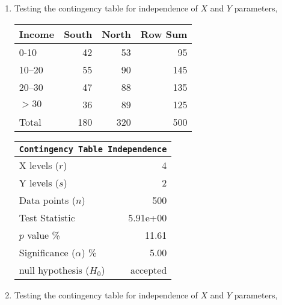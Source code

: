 \begin{enumerate}
\begin{table}[H]
\begin{minipage}{0.4\textwidth}
		\end{minipage}
	\end{table}
	\bigskip
	
	\item Testing the contingency table for independence of $ X $ and $ Y $ parameters,
	
	\begin{table}[H]
		\centering
		\begin{minipage}{0.49\textwidth}
			\centering
			\begin{tabular}{lrrr}
				\toprule
				Income &  South &  North &  Row Sum \\
				\midrule
				0-10   &     42 &     53 &       95 \\
				10–20  &     55 &     90 &      145 \\
				20–30  &     47 &     88 &      135 \\
				$ >30 $    &     36 &     89 &      125 \\
				\midrule
				Total  &    180 &    320 &      500 \\
				\bottomrule
			\end{tabular}
			
		\end{minipage}
		\begin{minipage}{0.49\textwidth}
			\centering
			\begin{tabular}{@{}lr@{}}
				\toprule
				\multicolumn{2}{c}{\texttt{Contingency Table Independence}} \\
				\midrule
				X levels ($r$)             &         4 \\
				Y levels ($s$)             &         2 \\
				Data points ($n$)          &       500 \\
				Test Statistic             &  5.91e+00 \\
				$p$ value \%               &     11.61 \\
				Significance ($\alpha$) \% &      5.00 \\
				null hypothesis ($H_0$)    &  accepted \\
				\bottomrule
			\end{tabular}
			
		\end{minipage}
	\end{table}
	\bigskip
	
	\item Testing the contingency table for independence of $ X $ and $ Y $ parameters,
	

\end{enumerate}
